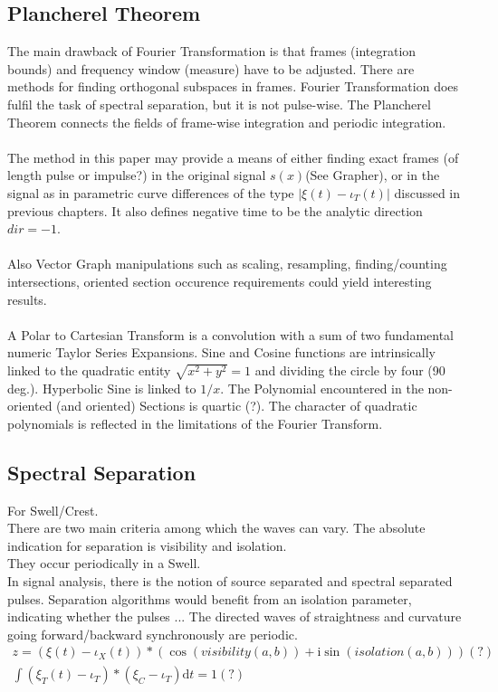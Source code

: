 \documentclass{report}
\begin{document}
\subsection{Plancherel Theorem}
The main drawback of Fourier Transformation is that frames (integration bounds) and frequency window (measure) have to be adjusted. There are methods for finding orthogonal subspaces in frames. Fourier Transformation does fulfil the task of spectral separation, but it is not pulse-wise. The Plancherel Theorem connects the fields of frame-wise integration and periodic integration.\\\\
The method in this paper may provide a means of either finding exact frames (of length pulse or impulse?) in the original signal $s(x)$(See Grapher), or in the signal as in parametric curve differences of the type $\lvert \xi(t)-\iota_{T}(t) \rvert$ discussed in previous chapters. It also defines negative time to be the analytic direction $dir=-1$.\\\\
Also Vector Graph manipulations such as scaling, resampling, finding/counting intersections, oriented section occurence requirements could yield interesting results.\\\\
A Polar to Cartesian Transform is a convolution with a sum of two fundamental numeric Taylor Series Expansions. Sine and Cosine functions are intrinsically linked to the quadratic entity $\sqrt{x^2 + y^2} =1$ and dividing the circle by four (90 deg.). Hyperbolic Sine is linked to $1/x$. The Polynomial encountered in the non-oriented (and oriented) Sections is quartic (?). The character of quadratic polynomials is reflected in the limitations of the Fourier Transform.

\subsection{Spectral Separation}
For Swell/Crest.\\
There are two main criteria among which the waves can vary. The absolute indication for separation is visibility and isolation.\\
They occur periodically in a Swell.\\
In signal analysis, there is the notion of source separated and spectral separated pulses. Separation algorithms would benefit from an isolation parameter, indicating whether the pulses ...
The directed waves of straightness and curvature going forward/backward synchronously are periodic.
\begin{align}
z =  (\xi(t)-\iota_{X}(t))*(\cos{(visibility(a,b))} +\mathrm{i} \sin{(isolation(a,b))})(?)\\
\int \limits _{}^{} (\xi_{T}(t)-\iota_{T})*(\xi_{C}-\iota_{T})\mathrm{d}t=1(?)
\end{align}
\end{document}
